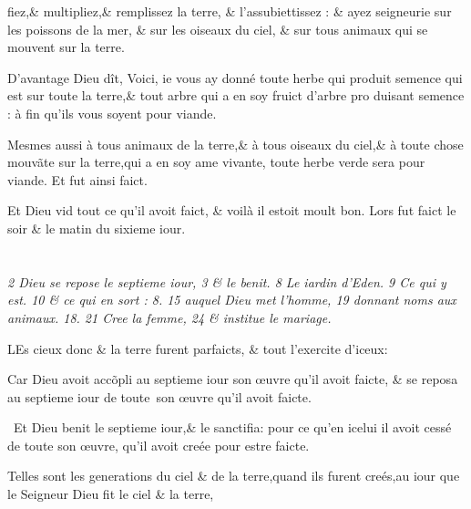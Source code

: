\documentclass[twocolumn,paper=a4,pagesize=pdftex,12pt,headinclude=on]{scrbook}
\newenvironment{chaptercomment}
  {%
    \setlength{\leftskip}{1em}
    \setlength{\rightskip}{1em}
    \begin{spacing}{0.8}
      \itshape\tiny\hspace{-2em}}
  {%
    \end{spacing}
    \setlength{\leftskip}{0pt}
    \setlength{\rightskip}{0pt}
  }
\newcounter{verse}
\newcommand{\bverse}{%
  \addtocounter{verse}{1}
  \theverse\quad
}
\newcommand{\bversenonum}{%
   \addtocounter{verse}{1}
   \par
}
\newcommand{\bchapter}[1][chap.]{%
   \setcounter{verse}{0}%
   \def\chaptertitle{#1}
   \section{}{}
   \setcounter{footnotemain}{0}
}
\let\lb\linebreak
\begin{document}
\vfill\break
\noindent fiez,\& multipliez,\& remplissez la terre,
\& l'assubiettissez : \& \footnotemarkmain{}ayez seigneurie
sur les poissons de la mer, \& sur les oi\-seaux
du ciel, \& sur tous animaux qui se mouvent sur la terre.

\bverse D'avantage Dieu dît, Voici, ie vous
ay donné toute herbe qui produit se\-mence
qui est sur toute la terre,\& tout
arbre qui a en soy fruict d'arbre pro\-
duisant semence : \footnotemarkverse{}à fin qu'ils vous
soyent pour viande.

\bverse Mesmes aussi à tous animaux de la
terre,\& à tous oiseaux du ciel,\& à tou\-te
chose mouv\~ate sur la terre,qui a en
soy ame vivante, toute herbe verde se\-ra
pour viande. Et fut ainsi faict.

\bverse \footnotemarkmain{} \footnotemarkverse{}Et Dieu vid
tout ce qu'il avoit faict, \& voilà il estoit moult bon. Lors
fut faict le soir \& le matin du sixieme
iour.


\bchapter
{}
\pagestyle{scrplain}

\begin{chaptercomment}
 \emph{2} Dieu se repose le septieme iour,
 \emph{3} \& le benit.
 \emph{8} Le iardin d'Eden. \lb
 \emph{9} Ce qui y est.
 \emph{10} \& ce qui en sort :
 \emph{8. 15} auquel Dieu \lb
 met l'homme,
 \emph{19} donnant noms aux animaux.
 \emph{18. 21} Cree la \lb
 femme,
 \emph{24} \& institue le mariage.
\end{chaptercomment}

\vspace{\baselineskip}

\bversenonum \lettrine[lines=3,loversize=-0.2,lraise=0.2]{L}{}Es cieux donc \& la terre furent
parfaicts, \& tout l'exercite d'i\-ceux:

\bverse \footnotemarkmain{}Car Dieu avoit acc\~opli au septie\-me
iour son \oe{}uvre qu'il avoit faicte, \lb
\footnotemarkmain{}\& se reposa au septieme iour de tou\-te~son
\oe{}uvre qu'il avoit faicte.

\bverse Et Dieu \footnotemarkmain{}benit le septieme iour,\& le
sanctifia: pour ce qu'en icelui il avoit
cessé de toute son \oe{}uvre, qu'il avoit
creée pour estre faicte.

\bverse Telles sont les generations du ciel
\& de la terre,quand ils furent creés,au
iour que le Seigneur Dieu fit le ciel \&
la terre,
\end{document}
